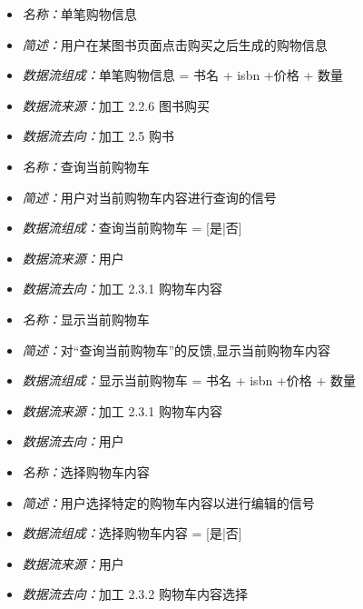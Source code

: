 \vspace{-1mm}

\begin{itemize}
	\item \textit{名称：}单笔购物信息
	\item \textit{简述：}用户在某图书页面点击购买之后生成的购物信息
	\item \textit{数据流组成：}单笔购物信息 = 书名 + isbn +价格 + 数量
	\item \textit{数据流来源：}加工 2.2.6 图书购买
	\item \textit{数据流去向：}加工 2.5 购书
\end{itemize}

\vspace{-1mm}

\begin{itemize}
	\item \textit{名称：}查询当前购物车
	\item \textit{简述：}用户对当前购物车内容进行查询的信号
	\item \textit{数据流组成：}查询当前购物车 = [是|否]
	\item \textit{数据流来源：}用户
	\item \textit{数据流去向：}加工 2.3.1 购物车内容
\end{itemize}

\vspace{-1mm}

\begin{itemize}
	\item \textit{名称：}显示当前购物车
	\item \textit{简述：}对“查询当前购物车”的反馈,显示当前购物车内容
	\item \textit{数据流组成：}显示当前购物车 = 书名 + isbn +价格 + 数量
	\item \textit{数据流来源：}加工 2.3.1 购物车内容
	\item \textit{数据流去向：}用户
\end{itemize}

\vspace{-1mm}

\begin{itemize}
	\item \textit{名称：}选择购物车内容
	\item \textit{简述：}用户选择特定的购物车内容以进行编辑的信号
	\item \textit{数据流组成：}选择购物车内容 = [是|否]
	\item \textit{数据流来源：}用户
	\item \textit{数据流去向：}加工 2.3.2 购物车内容选择
\end{itemize}

